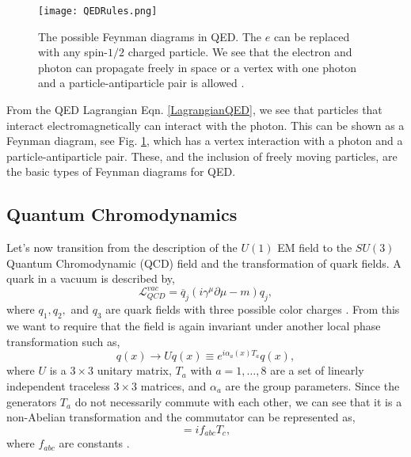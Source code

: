 \begin{figure}
 	\centering
	\texttt{[image: QEDRules.png]}
 	\caption[QED Feynman Diagrams]{The possible Feynman diagrams in QED. The $e$ can be replaced with any spin-$1/2$ charged particle. We see that the electron and photon can propagate freely in space or a vertex with one photon and a particle-antiparticle pair is allowed \cite{noauthor_https://www.quantumdiaries.org/2010/03/07/more-feynman-diagrams-momentum-conservation/_nodate}.}
 	\label{QEDRules} 
\end{figure}

From the QED Lagrangian Eqn. \ref{LagrangianQED}, we see that particles that interact electromagnetically can interact with the photon. This can be shown as a Feynman diagram, see Fig. \ref{QEDRules}, which has a vertex interaction with a photon and a particle-antiparticle pair. These, and the inclusion of freely moving particles, are the basic types of Feynman diagrams for QED. 

\subsection{Quantum Chromodynamics}

Let's now transition from the description of the $U(1)$ EM field to the $SU(3)$ Quantum Chromodynamic (QCD) field and the transformation of quark fields. A quark in a vacuum is described by,
\begin{equation}\label{LagrangianQCDVacuum}
\mathcal{L}_{QCD}^{vac}=\overline{q}_j(i\gamma^\mu\partial\mu-m)q_j,
\end{equation}
where $q_1, q_2,$ and $q_3$ are quark fields with three possible color charges \cite{halzen_quarks_1984, peskin_introduction_1995}. From this we want to require that the field is again invariant under another local phase transformation such as,
\begin{equation}
q(x)\rightarrow Uq(x)\equiv e^{i\alpha_a(x)T_a}q(x),
\end{equation}
where $U$ is a $3\times3$ unitary matrix, $T_a$ with $a=1,\ldots,8$ are a set of linearly independent traceless $3\times3$ matrices, and $\alpha_a$ are the group parameters. Since the generators $T_a$ do not necessarily commute with each other, we can see that it is a non-Abelian transformation and the commutator can be represented as,
\begin{equation}
[T_a, T_b]=if_{abc}T_c,
\end{equation}
where $f_{abc}$ are constants \cite{halzen_quarks_1984, peskin_introduction_1995}. 


